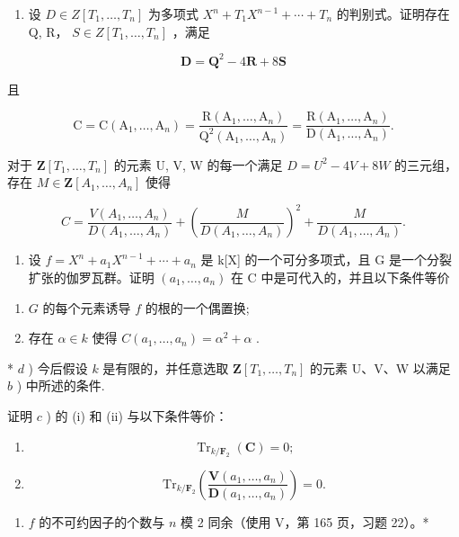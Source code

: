 \begin{enumerate}
\def\labelenumi{\alph{enumi})}
\setcounter{enumi}{1}
\tightlist
\item
  设 \(D \in Z[T_{1}, \ldots, T_{n}]\) 为多项式 \(X^{n} + T_{1}X^{n-1} + \cdots + T_{n}\) 的判别式。证明存在 Q, R， \(S \in Z[T_{1}, \ldots, T_{n}]\) ，满足
\end{enumerate}

\[
\mathbf {D} = \mathbf {Q} ^ {2} - 4 \mathbf {R} + 8 \mathbf {S}
\]

且

\[
\mathrm{C} = \mathrm{C} (\mathrm{A} _ {1}, \dots , \mathrm{A} _ {n}) = \frac {\mathrm{R} (\mathrm{A} _ {1} , \dots , \mathrm{A} _ {n})}{\mathrm{Q} ^ {2} (\mathrm{A} _ {1} , \dots , \mathrm{A} _ {n})} = \frac {\mathrm{R} (\mathrm{A} _ {1} , \dots , \mathrm{A} _ {n})}{\mathrm{D} (\mathrm{A} _ {1} , \dots , \mathrm{A} _ {n})}.
\]

对于 \(\mathbf{Z}[T_1, \ldots, T_n]\) 的元素 U, V, W 的每一个满足 \(D = U^2 - 4V + 8W\) 的三元组，存在 \(M \in \mathbf{Z}[A_1, \ldots, A_n]\) 使得

\[
C = \frac {V (A _ {1} , \dots , A _ {n})}{D (A _ {1} , \dots , A _ {n})} + \left(\frac {M}{D (A _ {1} , \dots , A _ {n})}\right) ^ {2} + \frac {M}{D (A _ {1} , \dots , A _ {n})}.
\]

\begin{enumerate}
\def\labelenumi{\alph{enumi})}
\setcounter{enumi}{2}
\tightlist
\item
  设 \(f = X^{n} + a_{1}X^{n-1} + \cdots + a_{n}\) 是 k{[}X{]} 的一个可分多项式，且 G 是一个分裂扩张的伽罗瓦群。证明 \((a_{1}, \ldots, a_{n})\) 在 C 中是可代入的，并且以下条件等价
\end{enumerate}

\begin{enumerate}
\def\labelenumi{(\roman{enumi})}
\item
  \(G\) 的每个元素诱导 \(f\) 的根的一个偶置换;
\item
  存在 \(\alpha \in k\) 使得 \(C(a_{1},\ldots ,a_{n}) = \alpha^{2} + \alpha\) .
\end{enumerate}

* \(d\) ) 今后假设 \(k\) 是有限的，并任意选取 \(\mathbf{Z}[T_1, \ldots, T_n]\) 的元素 U、V、W 以满足 \(b\) ) 中所述的条件.

证明 \(c\) ) 的 (i) 和 (ii) 与以下条件等价：

\begin{enumerate}
\def\labelenumi{(\roman{enumi})}
\setcounter{enumi}{2}
\tightlist
\item
  \[
\operatorname{Tr} _ {k / \mathbf {F} _ {2}} (\mathbf {C}) = 0;
\]
\item
  \[
\mathrm{Tr} _ {k / \mathbf {F} _ {2}} \left(\frac {\mathbf {V} (a _ {1} , \dots , a _ {n})}{\mathbf {D} (a _ {1} , \dots , a _ {n})}\right) = 0.
\]
\end{enumerate}

\begin{enumerate}
\def\labelenumi{(\alph{enumi})}
\setcounter{enumi}{21}
\tightlist
\item
  \(f\) 的不可约因子的个数与 \(n\) 模 2 同余（使用 V，第 165 页，习题 22）。*
\end{enumerate}

